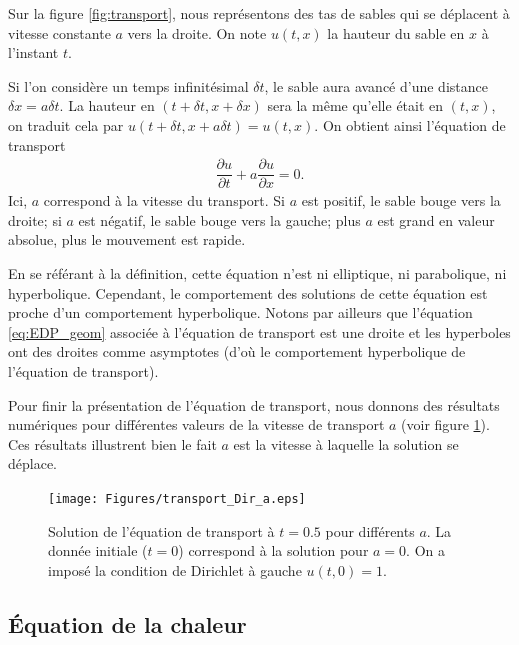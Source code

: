 \documentclass[12pt,a4paper,twoside]{article}
\begin{document}
Sur la figure \ref{fig:transport}, nous repr\'esentons des tas de sables
qui se d\'eplacent \`a vitesse constante $a$ vers la droite.
On note $u(t,x)$ la hauteur du sable en $x$ \`a l'instant $t$.

Si l'on consid\`ere un temps infinit\'esimal $\delta t$,
le sable aura avanc\'e d'une distance $\delta x = a \delta t$.
La hauteur en $(t+\delta t , x + \delta x)$ sera la m\^eme qu'elle
\'etait en $(t,x)$, on traduit cela par $u(t+\delta t, x + a \delta t) = u(t,x)$.
On obtient ainsi l'\'equation de transport
\begin{align}
  \dfrac{\partial u}{\partial t} + a \dfrac{\partial u}{\partial x} = 0 .
\end{align}
Ici, $a$ correspond \`a la vitesse du transport.
Si $a$ est positif, le sable bouge vers la droite; si $a$ est n\'egatif,
le sable bouge vers la gauche; plus $a$ est grand en valeur absolue, 
plus le mouvement est rapide.


\begin{remark}
  En se r\'ef\'erant \`a la d\'efinition, cette \'equation n'est ni elliptique, 
  ni parabolique, ni hyperbolique. Cependant, le comportement des solutions de 
  cette \'equation est proche d'un comportement hyperbolique.
  Notons par ailleurs que l'\'equation \eqref{eq:EDP_geom} associ\'ee
  \`a l'\'equation de transport est une droite et les hyperboles ont des droites
  comme asymptotes (d'o\`u le comportement hyperbolique de l'\'equation de transport).
\end{remark}

Pour finir la pr\'esentation de l'\'equation de transport,
nous donnons des r\'esultats num\'eriques pour diff\'erentes
valeurs de la vitesse de transport $a$ (voir figure \ref{fig:transport_a}).
Ces r\'esultats illustrent bien le fait $a$ est la vitesse \`a laquelle
la solution se d\'eplace.


\begin{figure}[h]
  \centering
  \texttt{[image: Figures/transport\_Dir\_a.eps]}
  \caption{Solution de l'\'equation de transport \`a $t=0.5$
  pour diff\'erents $a$. La donn\'ee initiale ($t=0$) correspond \`a 
  la solution pour $a = 0$. On a impos\'e la condition de Dirichlet \`a gauche $u(t,0) = 1$.}
  \label{fig:transport_a}
\end{figure}


\subsection{\'Equation de la chaleur}
\end{document}
